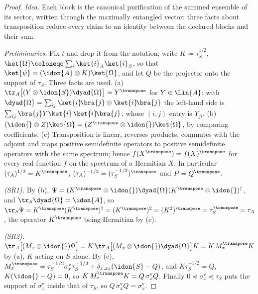 \begin{proof}
\emph{Idea.} Each block is the canonical purification of the summed
ensemble of its sector, written through the maximally entangled vector; three
facts about transposition reduce every claim to an identity between the
declared blocks and their sum.

\emph{Preliminaries.} Fix $t$ and drop it from the notation; write
$K\coloneqq\tau_S^{1/2}$,
$\ket{\Omega}\coloneqq\sum_i\ket{i}_A\ket{i}_S$, so that
$\ket{\psi}=(\idon{A}\otimes K)\ket{\Omega}$, and let $Q$ be the projector
onto the support of $\tau_S$. Three facts are used. (a)
$\tr_A\big[(Y\otimes\idon{S})\dyad{\Omega}\big]=Y^{\transpose}$ for
$Y\in\Lin{A}$: with $\dyad{\Omega}=\sum_{ij}\ket{i}\!\bra{j}\otimes
\ket{i}\!\bra{j}$ the left-hand side is $\sum_{ij}\bra{j}Y\ket{i}\,
\ket{i}\!\bra{j}$, whose $(i,j)$ entry is $Y_{ji}$. (b)
$(\idon{}\otimes Z)\ket{\Omega}=(Z^{\transpose}\otimes\idon{})\ket{\Omega}$,
by comparing coefficients. (c) Transposition is linear, reverses products,
commutes with the adjoint and maps positive semidefinite operators to
positive semidefinite operators with the same spectrum; hence
$f(X^{\transpose})=f(X)^{\transpose}$ for every real function $f$ on the
spectrum of a Hermitian $X$. In particular $(\tau_A)^{1/2}=K^{\transpose}$,
$(\tau_A)^{-1/2}=(\tau_S^{-1/2})^{\transpose}$ and $P=Q^{\transpose}$.

\emph{(SR1).} By (b),
$\Psi=(K^{\transpose}\otimes\idon{})\dyad{\Omega}
(K^{\transpose}\otimes\idon{})^{\dagger}$, and
$\tr_S\dyad{\Omega}=\idon{A}$, so
$\tr_S\Psi=K^{\transpose}(K^{\transpose})^{\dagger}=(K^{\transpose})^2
=(K^2)^{\transpose}=\tau_S^{\transpose}=\tau_A$, the operator
$K^{\transpose}$ being Hermitian by (c).

\emph{(SR2).} $\tr_A\big[(M_x\otimes\idon{})\Psi\big]
=K\,\tr_A\big[(M_x\otimes\idon{})\dyad{\Omega}\big]K=K\,M_x^{\transpose}K$
by (a), $K$ acting on $S$ alone. By (c),
$M_x^{\transpose}=\tau_S^{-1/2}\sigma^{\mathrm v}_x\tau_S^{-1/2}
+\delta_{x,x_0}(\idon{S}-Q)$, and $K\tau_S^{-1/2}=Q$, $K(\idon{}-Q)=0$, so
$K\,M_x^{\transpose}K=Q\,\sigma^{\mathrm v}_xQ$. Finally
$0\preceq\sigma^{\mathrm v}_x\preceq\tau_S$ puts the support of
$\sigma^{\mathrm v}_x$ inside that of $\tau_S$, so
$Q\,\sigma^{\mathrm v}_xQ=\sigma^{\mathrm v}_x$.


\end{proof}
